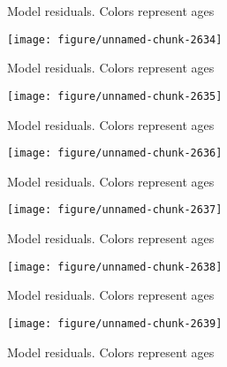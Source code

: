 \documentclass[a4paper]{article}\usepackage{graphicx, color}
\makeatletter
\def\maxwidth{ %
  \ifdim\Gin@nat@width>\linewidth
    \linewidth
  \else
    \Gin@nat@width
  \fi
}
\newenvironment{knitrout}{}{} %
\makeatother
\begin{document}
\begin{knitrout}
\begin{figure}[H]
\caption[Model residuals]{Model residuals. Colors represent ages\label{fig:unnamed-chunk-2633}}
\end{figure}
\begin{figure}[H]


{\centering \texttt{[image: figure/unnamed-chunk-2634]} 

}

\caption[Model residuals]{Model residuals. Colors represent ages\label{fig:unnamed-chunk-2634}}
\end{figure}
\begin{figure}[H]


{\centering \texttt{[image: figure/unnamed-chunk-2635]} 

}

\caption[Model residuals]{Model residuals. Colors represent ages\label{fig:unnamed-chunk-2635}}
\end{figure}
\begin{figure}[H]


{\centering \texttt{[image: figure/unnamed-chunk-2636]} 

}

\caption[Model residuals]{Model residuals. Colors represent ages\label{fig:unnamed-chunk-2636}}
\end{figure}
\begin{figure}[H]


{\centering \texttt{[image: figure/unnamed-chunk-2637]} 

}

\caption[Model residuals]{Model residuals. Colors represent ages\label{fig:unnamed-chunk-2637}}
\end{figure}
\begin{figure}[H]


{\centering \texttt{[image: figure/unnamed-chunk-2638]} 

}

\caption[Model residuals]{Model residuals. Colors represent ages\label{fig:unnamed-chunk-2638}}
\end{figure}
\begin{figure}[H]


{\centering \texttt{[image: figure/unnamed-chunk-2639]} 

}

\caption[Model residuals]{Model residuals. Colors represent ages\label{fig:unnamed-chunk-2639}}
\end{figure}
\begin{figure}[H]



\end{figure}
\end{knitrout}
\end{document}
